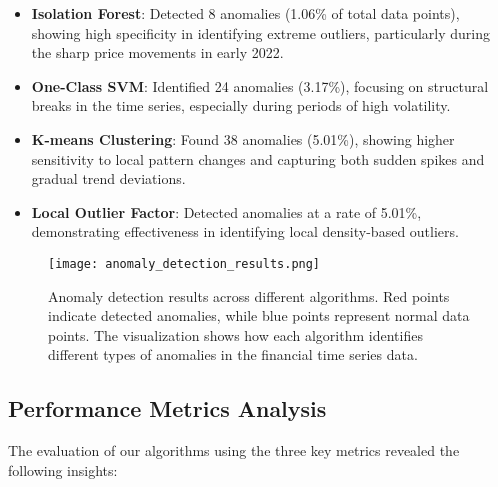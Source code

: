 \documentclass[conference]{IEEEtran}
\begin{document}
\begin{itemize}
    \item \textbf{Isolation Forest}: Detected 8 anomalies (1.06\% of total data points), showing high specificity in identifying extreme outliers, particularly during the sharp price movements in early 2022.
    
    \item \textbf{One-Class SVM}: Identified 24 anomalies (3.17\%), focusing on structural breaks in the time series, especially during periods of high volatility.
    
    \item \textbf{K-means Clustering}: Found 38 anomalies (5.01\%), showing higher sensitivity to local pattern changes and capturing both sudden spikes and gradual trend deviations.
    
    \item \textbf{Local Outlier Factor}: Detected anomalies at a rate of 5.01\%, demonstrating effectiveness in identifying local density-based outliers.
\end{itemize}

\begin{figure}[!ht]
\centering
\texttt{[image: anomaly\_detection\_results.png]}
\caption{Anomaly detection results across different algorithms. Red points indicate detected anomalies, while blue points represent normal data points. The visualization shows how each algorithm identifies different types of anomalies in the financial time series data.}
\label{fig:anomaly_results}
\end{figure}

\subsection{Performance Metrics Analysis}
The evaluation of our algorithms using the three key metrics revealed the following insights:
\end{document}
